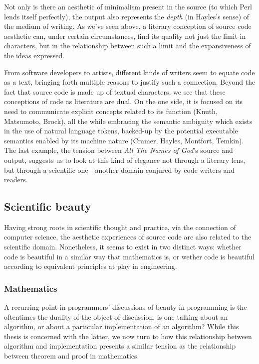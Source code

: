 Not only is there an aesthetic of minimalism present in the source (to which Perl lends itself perfectly), the output also represents the \emph{depth} (in Hayles's sense) of the medium of writing. As we've seen above, a literary conception of source code aesthetic can, under certain circumstances, find its quality not just the limit in characters, but in the relationship between such a limit and the expansiveness of the ideas expressed.

\vspace*{1\baselineskip}

From software developers to artists, different kinds of writers seem to equate code as a text, bringing forth multiple reasons to justify such a connection. Beyond the fact that source code is made up of textual characters, we see that these conceptions of code as literature are dual. On the one side, it is focused on its need to communicate explicit concepts related to its function (Knuth, Matsumoto, Brock), all the while embracing the semantic ambiguity which exists in the use of natural language tokens, backed-up by the potential executable semantics enabled by its machine nature (Cramer, Hayles, Montfort, Temkin).
The last example, the tension between \emph{All The Names of God}'s source and output, suggests us to look at this kind of elegance not through a literary lens, but through a scientific one—another domain conjured by code writers and readers.

\subsection{Scientific beauty} %

Having strong roots in scientific thought and practice, via the connection of computer science, the aesthetic experiences of source code are also related to the scientific domain. Nonetheless, it seems to exist in two distinct ways: whether code is beautiful in a similar way that mathematics is, or wether code is beautiful according to equivalent principles at play in engineering.

\subsubsection{Mathematics} %

A recurring point in programmers' discussions of beauty in programming is the oftentimes the duality of the object of discussion: is one talking about an algorithm, or about a particular implementation of an algorithm? While this thesis is concerned with the latter, we now turn to how this relationship between algorithm and implementation presents a similar tension as the relationship between theorem and proof in mathematics.

